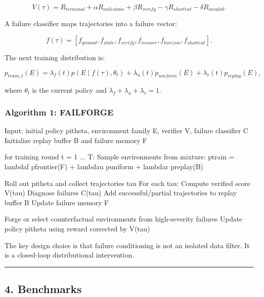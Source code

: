 \documentclass[
]{article}
\newenvironment{Shaded}{}{}
\newcommand{\NormalTok}[1]{#1}
\begin{document}
\[ V(\tau)=R_{terminal} + \alpha R_{milestone} +
\beta R_{verify} - \gamma R_{shortcut} - \delta R_{invalid}.
\]

A failure classifier maps trajectories into a failure vector:

\[
f(\tau)=[f_{ground},f_{state},f_{verify},f_{recover},f_{horizon},f_{shortcut}].
\]

The next training distribution is:

\[ p_{train,t}(E)= \lambda_f(t)p(E\mid f(\tau),\theta_t) +
\lambda_u(t)p_{uniform}(E) + \lambda_r(t)p_{replay}(E),
\]

where $\theta_t$ is the current policy and
$\lambda_f+\lambda_u+\lambda_r=1$.

\subsubsection{Algorithm 1: FAILFORGE}\label{algorithm-1-failforge}

\begin{Shaded}
\begin{Highlighting}[]
\NormalTok{Input: initial policy pitheta, environment family E, verifier V, failure classifier C}
\NormalTok{Initialize replay buffer B and failure memory F}

\NormalTok{for training round t = 1 ... T:}
\NormalTok{    Sample environments from mixture:}
\NormalTok{        ptrain = lambdaf pfrontier(F) + lambdau puniform + lambdar preplay(B)}

\NormalTok{    Roll out pitheta and collect trajectories tau}
\NormalTok{    For each tau:}
\NormalTok{        Compute verified score V(tau)}
\NormalTok{        Diagnose failures C(tau)}
\NormalTok{        Add successful/partial trajectories to replay buffer B}
\NormalTok{        Update failure memory F}

\NormalTok{    Forge or select counterfactual environments from high{-}severity failures}
\NormalTok{    Update policy pitheta using reward corrected by V(tau)}
\end{Highlighting}
\end{Shaded}

The key design choice is that failure conditioning is not an isolated
data filter. It is a closed-loop distributional intervention.

\begin{center}\rule{0.5\linewidth}{0.5pt}\end{center}

\subsection{4. Benchmarks}\label{benchmarks}
\end{document}
